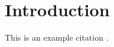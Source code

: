 \documentclass{article}
\begin{document}
\section{Introduction}
This is an example citation \cite{khade2023}.



\end{document}
